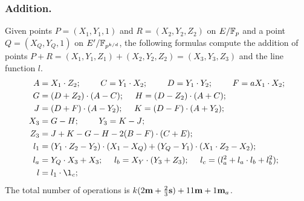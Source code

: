 \subsubsection{Addition.}
Given points $P = (X_1,Y_1,1)$ and $R = (X_2,Y_2,Z_2)$ on $E/\mathbb{F}_{p}$ and a point $Q = (X_Q,Y_Q,1)$ on $E'/\mathbb{F}_{p^{k/d}}$,
the following formulas compute the addition of points $P + R = (X_1,Y_1,Z_1) + (X_2,Y_2,Z_2) = (X_3,Y_3,Z_3)$ and the line function $l$.
\begin{align*}
A &= X_1 \cdot Z_2;\	\qquad
C = Y_1 \cdot X_2;\	\qquad
D = Y_1 \cdot Y_2;\	\qquad
F = a X_1 \cdot X_2;\\
G &= (D + Z_2) \cdot (A - C);\	\quad
H = (D - Z_2) \cdot (A + C);\\
J &= (D + F) \cdot (A - Y_2);\	\quad
K = (D - F) \cdot (A + Y_2);\\
X_3 &= G - H;\	\qquad
Y_3 = K - J;\\
Z_3 &= J + K - G - H - 2(B - F) \cdot (C + E);\\
l_1 &= (Y_1 \cdot Z_2 - Y_2) \cdot (X_1 - X_Q) + (Y_Q - Y_1) \cdot (X_1 \cdot Z_2 - X_2);\\
l_a &= Y_Q \cdot X_3 + X_3;\	\quad
l_b = X_Y \cdot (Y_3 + Z_3);\	\quad
l_c = (l_a^2 + l_a \cdot l_b + l_b^2);\\
l &= l_1 \cdot \l_c;
\end{align*}
The total number of operations is
$ k(2\textbf{m} + \frac{2}{3}\textbf{s}) + 11\textbf{m} + 1\textbf{m}_a$.


